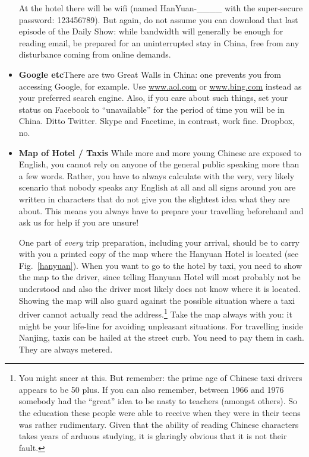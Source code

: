 \documentclass[11pt]{report}
\begin{document}
\begin{itemize}
At the hotel there will be wifi (named HanYuan-\_\_\_\_ with the super-secure
password: 123456789). But again, do not assume you can
download that last episode of the Daily Show: while bandwidth
will generally be enough for reading email, be prepared for an
uninterrupted stay in China, free from any disturbance coming
from online demands.
   
\item \textbf{Google etc}\hspace{3mm}There are two Great Walls in
China: one prevents you from accessing Google, for example. Use
\url{www.aol.com} or \url{www.bing.com} instead as your preferred
search engine. Also, if you care about such things, set your 
status on Facebook to ``unavailable'' for the period of time
you will be in China. Ditto Twitter. Skype and Facetime, in 
contrast, work fine. Dropbox, no.

\item \textbf{Map of Hotel / Taxis}\hspace{3mm} 
While more and more young Chinese are exposed to English, you
cannot rely on anyone of the general public speaking more than
a few words. Rather, you have to always calculate with the
very, very likely scenario that nobody speaks any English at
all and all signs around you are written in characters that do
not give you the slightest idea what they are about. This
means you always have to prepare your travelling beforehand
and ask us for help if you are unsure! 

One part of \emph{every} trip preparation, including your
arrival, should be to carry with you a printed copy of the map
where the Hanyuan Hotel is located (see Fig.~\ref{hanyuan}).
When you want to go to the hotel by taxi, you need to show the map to
the driver, since telling Hanyuan Hotel will most probably not
be understood and also the driver most likely does not know
where it is located. Showing the map will also guard against
the possible situation where a taxi driver cannot actually
read the address.\footnote{You might sneer at this. But
remember: the prime age of Chinese taxi drivers appears to be
50 plus. If you can also remember, between 1966 and 1976
somebody had the ``great'' idea to be nasty to teachers
(amongst others). So the education these people were able to
receive when they were in their teens was rather rudimentary.
Given that the ability of reading Chinese characters takes
years of arduous studying, it is glaringly obvious that it is
not their fault.} Take the map always with you: it might be
your life-line for avoiding unpleasant situations. For 
travelling inside Nanjing, taxis can be hailed at the
street curb. You need to pay them in cash. They are always
metered.


\end{itemize}
\end{document}
